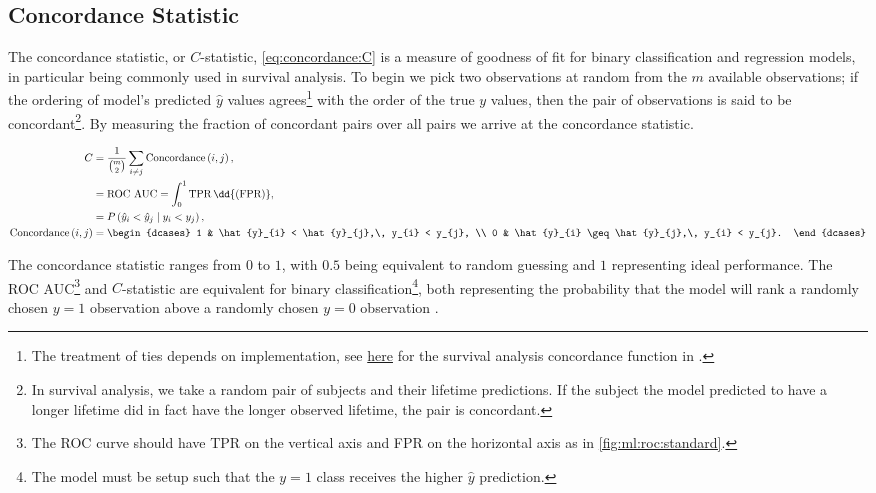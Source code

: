 \subsection{Concordance Statistic}
\label{ml_general:eval:concordance}

The concordance statistic, or $C$-statistic, \cref{eq:concordance:C} is a measure of goodness of fit
for binary classification and regression models, in particular being commonly used in survival analysis.
To begin we pick two observations at random from the $m$ available observations;
if the ordering of model's predicted $\hat{y}$ values agrees\footnote{The treatment of ties depends on implementation,
see \href{https://cran.r-project.org/web/packages/survival/vignettes/concordance.pdf}{here}
for the survival analysis concordance function in \R.} with the order of the true $y$ values,
then the pair of observations is said to be concordant\footnote{In survival analysis,
we take a random pair of subjects and their lifetime predictions.
If the subject the model predicted to have a longer lifetime
did in fact have the longer observed lifetime, the pair is concordant.}.
By measuring the fraction of concordant pairs over all pairs we arrive at the concordance statistic.

\begin{subequations} \label{eq:concordance}
\begin{align}
C &= \frac{1}{ \binom{m}{2} } \sum_{i \neq j} \text{Concordance}\left(i, j\right), \label{eq:concordance:C} \\
&= \text{ROC AUC} = \int_{0}^{1} \text{TPR}\, \dd{\left(\text{FPR}\right)}, \label{eq:concordance:ROC_AUC} \\
&= P\left(\hat{y}_{i} < \hat{y}_{j} \mid y_{i} < y_{j} \right), \label{eq:concordance:P} \\
\text{Concordance}\left(i, j\right) &= \begin{dcases}
1 & \hat{y}_{i} < \hat{y}_{j},\, y_{i} < y_{j}, \\
0 & \hat{y}_{i} \geq \hat{y}_{j},\, y_{i} < y_{j}.
\end{dcases} \label{eq:concordance:concordance} \\
\end{align}
\end{subequations}

The concordance statistic ranges from $0$ to $1$,
with $0.5$ being equivalent to random guessing and $1$ representing ideal performance.
The ROC AUC\footnote{The ROC curve should have TPR on the vertical axis and FPR on the horizontal axis as in \cref{fig:ml:roc:standard}.} and $C$-statistic are equivalent for
binary classification\footnote{The model must be setup such that the $y=1$ class receives the higher $\hat{y}$ prediction.},
both representing the probability that
the model will rank a randomly chosen $y=1$ observation above a randomly chosen $y=0$ observation \cite{Fawcett2006861}.

